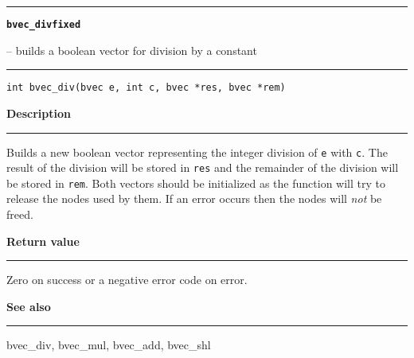 \begin{minipage}{\textwidth}

\noindent\begin{minipage}{\textwidth}
\rule{\textwidth}{0.5mm}
{\tt\bf bvec\_divfixed }
\--- builds a boolean vector for division by a constant  \hspace{\fill}
\\\rule[1.5ex]{\textwidth}{0.5mm}
\end{minipage}

\noindent\begin{verbatim}
int bvec_div(bvec e, int c, bvec *res, bvec *rem) 
\end{verbatim}

\vspace{\parsep}\noindent
{\bf Description}\\\rule[1.5ex]{\textwidth}{0.2mm}\vspace{-1.5ex}\setlength{\parindent}{1em}
Builds a new boolean vector representing the integer division
           of {\tt e} with {\tt c}. The result of the division will be stored
	   in {\tt res} and the remainder of the division will be stored in
	   {\tt rem}. Both vectors should be initialized as the function
	   will try to release the nodes used by them. If an error occurs then
	   the nodes will {\em not} be freed. 

\setlength{\parindent}{0em}\vspace{\parsep}\vspace{\baselineskip}\noindent
{\bf Return value}\\\rule[1.5ex]{\textwidth}{0.2mm}\vspace{-1.5ex}
Zero on success or a negative error code on error. 

\vspace{\parsep}\vspace{\baselineskip}\noindent
{\bf See also}\\\rule[1.5ex]{\textwidth}{0.2mm}\vspace{-1.5ex}
bvec\_div, bvec\_mul, bvec\_add, bvec\_shl 
\end{minipage}
\vspace{8ex}
